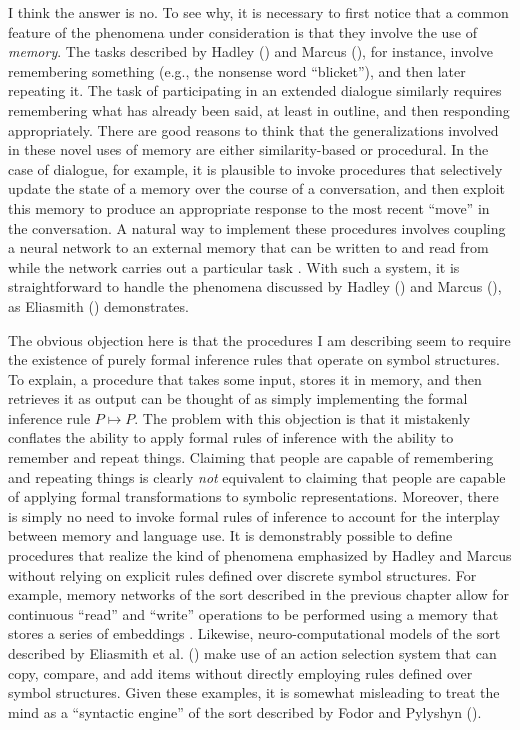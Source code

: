 I think the answer is no. To see why, it is necessary to first notice that a common feature of the phenomena under consideration is that they involve the use of \textit{memory}. The tasks described by Hadley (\citeyear{Hadley:2009}) and Marcus (\citeyear{Marcus:1998}), for instance, involve remembering something (e.g., the nonsense word ``blicket''), and then later repeating it. The task of participating in an extended dialogue similarly requires remembering what has already been said, at least in outline, and then responding appropriately. There are good reasons to think that the generalizations involved in these novel uses of memory are either similarity-based or procedural. In the case of dialogue, for example, it is plausible to invoke procedures that selectively update the state of a memory over the course of a conversation, and then exploit this memory to produce an appropriate response to the most recent ``move'' in the conversation. A natural way to implement these procedures involves coupling a neural network to an external memory that can be written to and read from while the network carries out a particular task \citep{Weston:2016,Weston:2015,Sukhbataar:2015,Eliasmith:2012,Graves:2014}. With such a system, it is straightforward to handle the phenomena discussed by Hadley (\citeyear{Hadley:2009}) and Marcus (\citeyear{Marcus:1998}), as Eliasmith (\citeyear{Eliasmith:2013}) demonstrates. 

The obvious objection here is that the procedures I am describing seem to require the existence of purely formal inference rules that operate on symbol structures. To explain, a procedure that takes some input, stores it in memory, and then retrieves it as output can be thought of as simply implementing the formal inference rule $P \mapsto P$. The problem with this objection is that it mistakenly conflates the ability to apply formal rules of inference with the ability to remember and repeat things. Claiming that people are capable of remembering and repeating things is clearly \textit{not} equivalent to claiming that people are capable of applying formal transformations to symbolic representations. Moreover, there is simply no need to invoke formal rules of inference to account for the interplay between memory and language use. It is demonstrably possible to define procedures that realize the kind of phenomena emphasized by Hadley and Marcus without relying on explicit rules defined over discrete symbol structures. For example, memory networks of the sort described in the previous chapter allow for continuous ``read'' and ``write'' operations to be performed using a memory that stores a series of embeddings \citep{Sukhbataar:2015,Graves:2014}. Likewise, neuro-computational models of the sort described by Eliasmith et al. (\citeyear{Eliasmith:2012}) make use of an action selection system that can copy, compare, and add items without directly employing rules defined over symbol structures. Given these examples, it is somewhat misleading to treat the mind as a ``syntactic engine'' of the sort described by Fodor and Pylyshyn (\citeyear{FodorPylyshyn:1988}).

